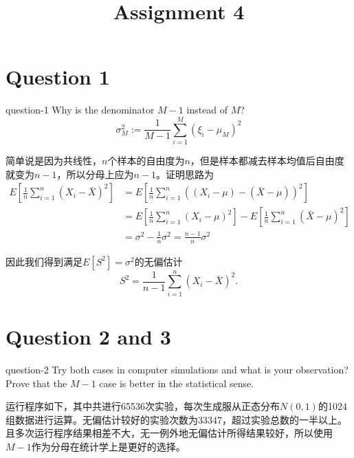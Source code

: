 \title{Assignment 4}


\section{Question 1}
\begin{statebox}{}{question-1}
    Why is the denominator $M-1$ instead of $M$?
    \[
    	\sigma_M^2 := \frac{1}{M-1}\sum_{i=1}^{M} (\xi_i-\mu_M)^2
    \]
\end{statebox}


简单说是因为共线性，$n$个样本的自由度为$n$，但是样本都减去样本均值后自由度就变为$n-1$，所以分母上应为$n-1$。证明思路为
\begin{align*}
	E\left[\frac{1}{n}\sum_{i=1}^{n}\left(X_i-\bar{X}\right)^2\right] &= E\left[\frac{1}{n}\sum_{i=1}^{n}\left((X_i-\mu)-(\bar{X}-\mu)\right)^2\right] \\
	&= E\left[\frac{1}{n}\sum_{i=1}^{n}\left(X_i-\mu\right)^2\right] - E\left[\frac{1}{n}\sum_{i=1}^{n}\left(\bar{X}-\mu\right)^2\right] \\
	&= \sigma^2 - \frac{1}{n}\sigma^2 = \frac{n-1}{n}\sigma^2
\end{align*}

因此我们得到满足$E[S^2]=\sigma^2$的无偏估计
\[
	S^2 = \frac{1}{n-1}\sum_{i=1}^{n}\left(X_i-\bar{X}\right)^2.
\]



\section{Question 2 and 3}
\begin{statebox}{}{question-2}
    Try both cases in computer simulations and what is your observation?
    Prove that the $M-1$ case is better in the statistical sense.
\end{statebox}

运行程序如下，其中共进行65536次实验，每次生成服从正态分布$N(0, 1)$的1024组数据进行运算。无偏估计较好的实验次数为33347，超过实验总数的一半以上。且多次运行程序结果相差不大，无一例外地无偏估计所得结果较好，所以使用$M-1$作为分母在统计学上是更好的选择。



% 
